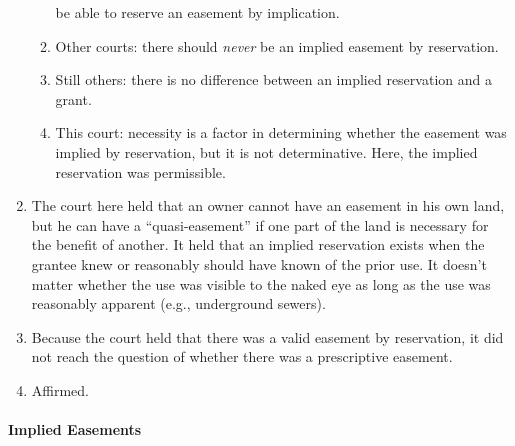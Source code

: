 \begin{enumerate}
\begin{enumerate}
        be able to reserve an easement by implication.
        \item Other courts: there should \emph{never} be an implied easement 
        by reservation.
        \item Still others: there is no difference between an implied 
        reservation and a grant.
        \item This court: necessity is a factor in determining whether the 
        easement was implied by reservation, but it is not determinative. 
        Here, the implied reservation was permissible.
    \end{enumerate}
    \item The court here held that an owner cannot have an easement in his 
    own land, but he can have a ``quasi-easement'' if one part of the land is 
    necessary for the benefit of another. It held that an implied reservation 
    exists when the grantee knew or reasonably should have known of the prior 
    use. It doesn't matter whether the use was visible to the naked eye as 
    long as the use was reasonably apparent (e.g., underground sewers).
    \item Because the court held that there was a valid easement by 
    reservation, it did not reach the question of whether there was a 
    prescriptive easement.
    \item Affirmed.
\end{enumerate}

\paragraph{Implied Easements}

